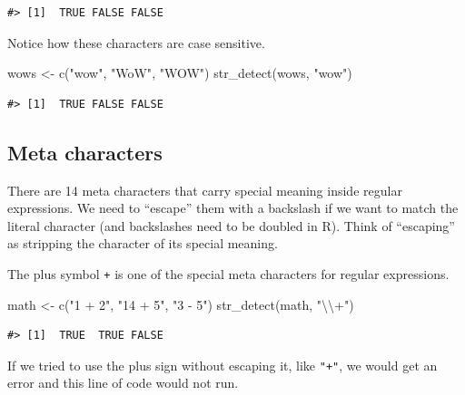 \documentclass[
]{krantz}
\makeatletter
\newenvironment{Shaded}{\begin{snugshade}}{\end{snugshade}}
\newcommand{\FunctionTok}[1]{\textcolor[rgb]{0.00,0.00,0.00}{#1}}
\newcommand{\NormalTok}[1]{#1}
\newcommand{\OtherTok}[1]{\textcolor[rgb]{0.56,0.35,0.01}{#1}}
\newcommand{\SpecialCharTok}[1]{\textcolor[rgb]{0.00,0.00,0.00}{#1}}
\newcommand{\StringTok}[1]{\textcolor[rgb]{0.31,0.60,0.02}{#1}}
\newenvironment{kframe}{%
\medskip{}
\setlength{\fboxsep}{.8em}
 \def\at@end@of@kframe{}%
 \ifinner\ifhmode%
  \def\at@end@of@kframe{\end{minipage}}%
  \begin{minipage}{\columnwidth}%
 \fi\fi%
 \def\FrameCommand##1{\hskip\@totalleftmargin \hskip-\fboxsep
 \colorbox{shadecolor}{##1}\hskip-\fboxsep
     \hskip-\linewidth \hskip-\@totalleftmargin \hskip\columnwidth}%
 \MakeFramed {\advance\hsize-\width
   \@totalleftmargin\z@ \linewidth\hsize
   \@setminipage}}%
 {\par\unskip\endMakeFramed%
 \at@end@of@kframe}
\renewenvironment{Shaded}{\begin{kframe}}{\end{kframe}}
\makeatother
\begin{document}
\begin{verbatim}
#> [1]  TRUE FALSE FALSE
\end{verbatim}

Notice how these characters are case sensitive.

\begin{Shaded}
\begin{Highlighting}[]
\NormalTok{wows }\OtherTok{\textless{}{-}} \FunctionTok{c}\NormalTok{(}\StringTok{"wow"}\NormalTok{, }\StringTok{"WoW"}\NormalTok{, }\StringTok{"WOW"}\NormalTok{)}
\FunctionTok{str\_detect}\NormalTok{(wows, }\StringTok{"wow"}\NormalTok{)}
\end{Highlighting}
\end{Shaded}

\begin{verbatim}
#> [1]  TRUE FALSE FALSE
\end{verbatim}

\hypertarget{meta-characters}{%
\subsection{Meta characters}\label{meta-characters}}

There are 14 meta characters that carry special meaning inside regular expressions. We need to ``escape'' them with a backslash if we want to match the literal character (and backslashes need to be doubled in R). Think of ``escaping'' as stripping the character of its special meaning.

The plus symbol \texttt{+} is one of the special meta characters for regular expressions.

\begin{Shaded}
\begin{Highlighting}[]
\NormalTok{math }\OtherTok{\textless{}{-}} \FunctionTok{c}\NormalTok{(}\StringTok{"1 + 2"}\NormalTok{, }\StringTok{"14 + 5"}\NormalTok{, }\StringTok{"3 {-} 5"}\NormalTok{)}
\FunctionTok{str\_detect}\NormalTok{(math, }\StringTok{"}\SpecialCharTok{\textbackslash{}\textbackslash{}}\StringTok{+"}\NormalTok{)}
\end{Highlighting}
\end{Shaded}

\begin{verbatim}
#> [1]  TRUE  TRUE FALSE
\end{verbatim}

If we tried to use the plus sign without escaping it, like \texttt{"+"}, we would get an error and this line of code would not run.
\end{document}
